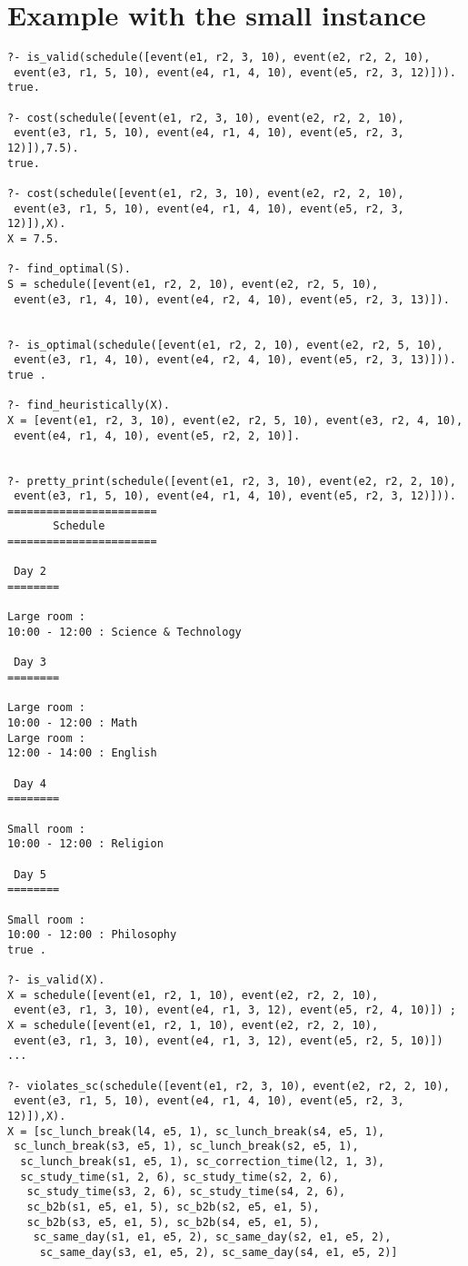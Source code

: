 \documentclass[a4paper]{article}
\begin{document}
\section{Example with the small instance}
\begin{lstlisting}[style=Linux]
?- is_valid(schedule([event(e1, r2, 3, 10), event(e2, r2, 2, 10),
 event(e3, r1, 5, 10), event(e4, r1, 4, 10), event(e5, r2, 3, 12)])).
true.

?- cost(schedule([event(e1, r2, 3, 10), event(e2, r2, 2, 10),
 event(e3, r1, 5, 10), event(e4, r1, 4, 10), event(e5, r2, 3, 12)]),7.5).
true.

?- cost(schedule([event(e1, r2, 3, 10), event(e2, r2, 2, 10),
 event(e3, r1, 5, 10), event(e4, r1, 4, 10), event(e5, r2, 3, 12)]),X).
X = 7.5.

?- find_optimal(S).
S = schedule([event(e1, r2, 2, 10), event(e2, r2, 5, 10),
 event(e3, r1, 4, 10), event(e4, r2, 4, 10), event(e5, r2, 3, 13)]).
 
 
?- is_optimal(schedule([event(e1, r2, 2, 10), event(e2, r2, 5, 10),
 event(e3, r1, 4, 10), event(e4, r2, 4, 10), event(e5, r2, 3, 13)])).
true .

?- find_heuristically(X).
X = [event(e1, r2, 3, 10), event(e2, r2, 5, 10), event(e3, r2, 4, 10),
 event(e4, r1, 4, 10), event(e5, r2, 2, 10)].


?- pretty_print(schedule([event(e1, r2, 3, 10), event(e2, r2, 2, 10),
 event(e3, r1, 5, 10), event(e4, r1, 4, 10), event(e5, r2, 3, 12)])).
=======================
       Schedule
=======================

 Day 2 
========

Large room :
10:00 - 12:00 : Science & Technology

 Day 3 
========

Large room :
10:00 - 12:00 : Math
Large room :
12:00 - 14:00 : English

 Day 4 
========

Small room :
10:00 - 12:00 : Religion

 Day 5 
========

Small room :
10:00 - 12:00 : Philosophy
true .

?- is_valid(X).
X = schedule([event(e1, r2, 1, 10), event(e2, r2, 2, 10),
 event(e3, r1, 3, 10), event(e4, r1, 3, 12), event(e5, r2, 4, 10)]) ;
X = schedule([event(e1, r2, 1, 10), event(e2, r2, 2, 10),
 event(e3, r1, 3, 10), event(e4, r1, 3, 12), event(e5, r2, 5, 10)])
...

?- violates_sc(schedule([event(e1, r2, 3, 10), event(e2, r2, 2, 10),
 event(e3, r1, 5, 10), event(e4, r1, 4, 10), event(e5, r2, 3, 12)]),X).
X = [sc_lunch_break(l4, e5, 1), sc_lunch_break(s4, e5, 1),
 sc_lunch_break(s3, e5, 1), sc_lunch_break(s2, e5, 1),
  sc_lunch_break(s1, e5, 1), sc_correction_time(l2, 1, 3),
  sc_study_time(s1, 2, 6), sc_study_time(s2, 2, 6),
   sc_study_time(s3, 2, 6), sc_study_time(s4, 2, 6),
   sc_b2b(s1, e5, e1, 5), sc_b2b(s2, e5, e1, 5),
   sc_b2b(s3, e5, e1, 5), sc_b2b(s4, e5, e1, 5),
    sc_same_day(s1, e1, e5, 2), sc_same_day(s2, e1, e5, 2),
     sc_same_day(s3, e1, e5, 2), sc_same_day(s4, e1, e5, 2)] 


\end{lstlisting}
\end{document}
